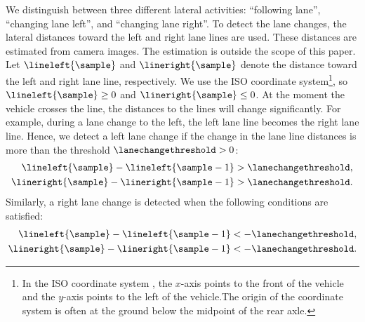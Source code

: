 We distinguish between three different lateral activities: ``following lane'', ``changing lane left'', and ``changing lane right''. 
To detect the lane changes, the lateral distances toward the left and right lane lines are used. 
These distances are estimated from camera images. 
The estimation is outside the scope of this paper. 
Let $\lineleft{\sample}$ and $\lineright{\sample}$ denote the distance toward the left and right lane line, respectively. 
\cstarta We use the ISO coordinate system\cenda\cstartc\footnote{\cstartc In the ISO coordinate system \autocite{iso8855}, the $x$-axis points to the front of the vehicle and the $y$-axis points to the left of the vehicle.\cendc\cstartd The origin of the coordinate system is often at the ground below the midpoint of the rear axle.\cendd}\cendc\cstarta, so $\lineleft{\sample} \geq 0$ and $\lineright{\sample} \leq 0$. At the moment the vehicle crosses the line, the distances to the lines will change significantly. For example, during a lane change to the left, the left lane line becomes the right lane line. Hence, we detect a left lane change \cstartd if the change in the lane line distances is more than the threshold $\lanechangethreshold>0$\cendd:
\begin{align}
	\lineleft{\sample} - \lineleft{\sample-1} &> \lanechangethreshold, \label{eq:potential left a} \\
	\lineright{\sample} - \lineright{\sample-1} &> \lanechangethreshold. \label{eq:potential left b}
\end{align}
Similarly, a right lane change is detected when the following conditions are satisfied:
\begin{align}
	\lineleft{\sample} - \lineleft{\sample-1} &< -\lanechangethreshold, \label{eq:potential right a}\\
	\lineright{\sample} - \lineright{\sample-1} &< -\lanechangethreshold. \label{eq:potential right b}
\end{align}


